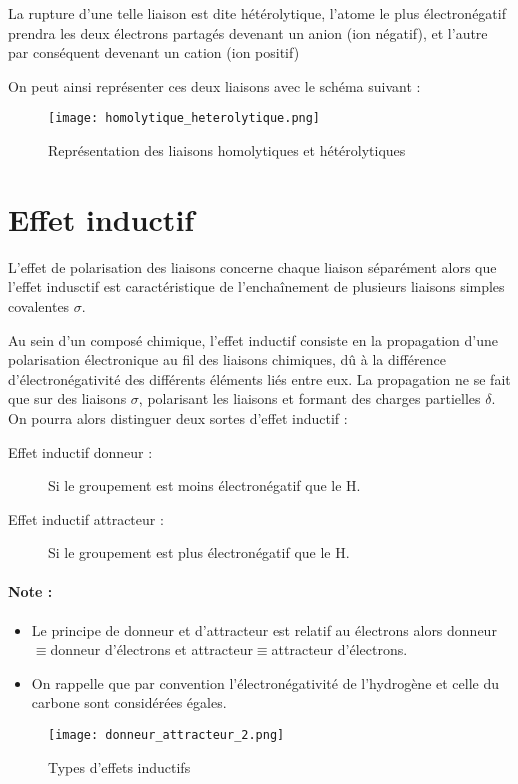 \documentclass[a4paper, oneside]{book}
\begin{document}
La rupture d'une telle liaison est dite hétérolytique, l'atome le plus électronégatif prendra les deux électrons partagés devenant un anion (ion négatif), et l'autre par conséquent devenant un cation (ion positif) 

On peut ainsi représenter ces deux liaisons avec le schéma suivant :
\begin{figure}[!h]
    \centering
    \texttt{[image: homolytique\_heterolytique.png]}
    \caption{Représentation des liaisons homolytiques et hétérolytiques}
    \label{fig:my_label}
\end{figure}
\chapter{Effet inductif}
\minitoc
L'effet de polarisation des liaisons concerne chaque liaison séparément alors que l'effet indusctif est caractéristique de l'enchaînement de plusieurs liaisons simples covalentes $\sigma$.

Au sein d'un composé chimique, l'effet inductif consiste en la propagation d'une polarisation électronique au fil des liaisons chimiques, dû à la différence d'électronégativité des différents éléments liés entre eux. La propagation ne se fait que sur des liaisons $\sigma$, polarisant les liaisons et formant des charges partielles $\delta$.\\
On pourra alors distinguer deux sortes d'effet inductif :
\begin{description}
    \item[Effet inductif donneur :] Si le groupement est moins électronégatif que le H.
    \item[Effet inductif attracteur :] Si le groupement est plus électronégatif que le H. 
\end{description}
\subsubsection*{Note :}
\begin{itemize}
    \item Le principe de donneur et d'attracteur est relatif au électrons alors donneur$\equiv$donneur d'électrons et attracteur$\equiv$attracteur d'électrons.
    \item On rappelle que par convention l'électronégativité de l'hydrogène et celle du carbone sont considérées égales.
\end{itemize}
\begin{figure}[!h]
    \centering
    \texttt{[image: donneur\_attracteur\_2.png]}
    \caption{Types d'effets inductifs}
    \label{fig:my_label}
\end{figure}
\end{document}
